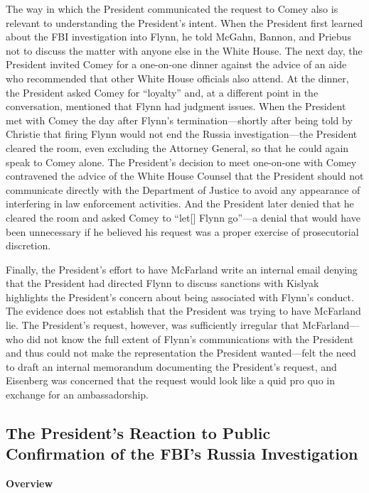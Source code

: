 The way in which the President communicated the request to Comey also is relevant to understanding the President's intent.
When the President first learned about the FBI investigation into Flynn, he told McGahn, Bannon, and Priebus not to discuss the matter with anyone else in the White House.
The next day, the President invited Comey for a one-on-one dinner against the advice of an aide who recommended that other White House officials also attend.
At the dinner, the President asked Comey for ``loyalty'' and, at a different point in the conversation, mentioned that Flynn had judgment issues.
When the President met with Comey the day after Flynn's termination---shortly after being told by Christie that firing Flynn would not end the Russia investigation---the President cleared the room, even excluding the Attorney General, so that he could again speak to Comey alone.
The President's decision to meet one-on-one with Comey contravened the advice of the White House Counsel that the President should not communicate directly with the Department of Justice to avoid any appearance of interfering in law enforcement activities.
And the President later denied that he cleared the room and asked Comey to ``let[] Flynn go''---a denial that would have been unnecessary if he believed his request was a proper exercise of prosecutorial discretion.

Finally, the President's effort to have McFarland write an internal email denying that the President had directed Flynn to discuss sanctions with Kislyak highlights the President's concern about being associated with Flynn's conduct.
The evidence does not establish that the President was trying to have McFarland lie.
The President's request, however, was sufficiently irregular that McFarland---who did not know the full extent of Flynn's communications with the President and thus could not make the representation the President wanted---felt the need to draft an internal memorandum documenting the President's request, and Eisenberg was concerned that the request would look like a quid pro quo in exchange for an ambassadorship.

\subsection{The President's Reaction to Public Confirmation of the FBI's Russia Investigation}

\begin{center}
\textbf{Overview}
\end{center}

